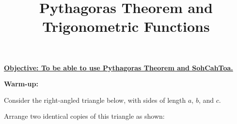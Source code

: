 \documentclass{article}
\begin{document}
\title{Pythagoras Theorem and Trigonometric Functions}
\date{}

\maketitle

\Large

{\bf \underline{Objective: To be able to use Pythagoras Theorem and SohCahToa.}}

\vspace{5mm}


\iffalse

{\bf Recap of previous material:}

\vspace{5mm}

\begin{enumerate}
\item Solve $3x^2-8x+4=0$.
\item Find the points where the parabola with equation $y=x^2+18x-39$ meets the $x$-axis.
\item Find the points where the line $y=3x-4$ and the parabola $y=-x^2-12x+9$ intersect.
\end{enumerate}


\clearpage

\fi




{\bf Warm-up:}

\vspace{5mm}

Consider the right-angled triangle below, with sides of length $a$, $b$, and $c$.

\begin{center}
\end{center}

Arrange two identical copies of this triangle as shown:

\begin{center}
\end{center}
\end{document}
